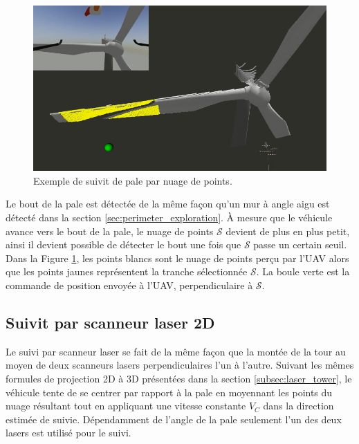 \begin{figure}[htp]
  \centering
  \includegraphics[width=0.7\linewidth]{images/suivit_nuage_points.png}
  \caption{Exemple de suivit de pale par nuage de points.}
  \label{fig:pcl_blade_follow}
\end{figure}

Le bout de la pale est détectée de la même façon qu'un mur à angle aigu est détecté dans la section \ref{sec:perimeter_exploration}. À mesure que le véhicule avance vers le bout de la pale, le nuage de points $\mathcal{S}$ devient de plus en plus petit, ainsi il devient possible de détecter le bout une fois que $\mathcal{S}$ passe un certain seuil. Dans la Figure \ref{fig:pcl_blade_follow}, les points blancs sont le nuage de points perçu par l'UAV alors que les points jaunes représentent la tranche sélectionnée $\mathcal{S}$. La boule verte est la commande de position envoyée à l'UAV, perpendiculaire à $\mathcal{S}$.

\subsection{Suivit par scanneur laser 2D}
\label{subsec:laser_blade}

Le suivi par scanneur laser se fait de la même façon que la montée de la tour au moyen de deux scanneurs lasers perpendiculaires l'un à l'autre. Suivant les mêmes formules de projection 2D à 3D présentées dans la section \ref{subsec:laser_tower}, le véhicule tente de se centrer par rapport à la pale en moyennant les points du nuage résultant tout en appliquant une vitesse constante $V_C$ dans la direction estimée de suivie. Dépendamment de l'angle de la pale seulement l'un des deux lasers est utilisé pour le suivi.

